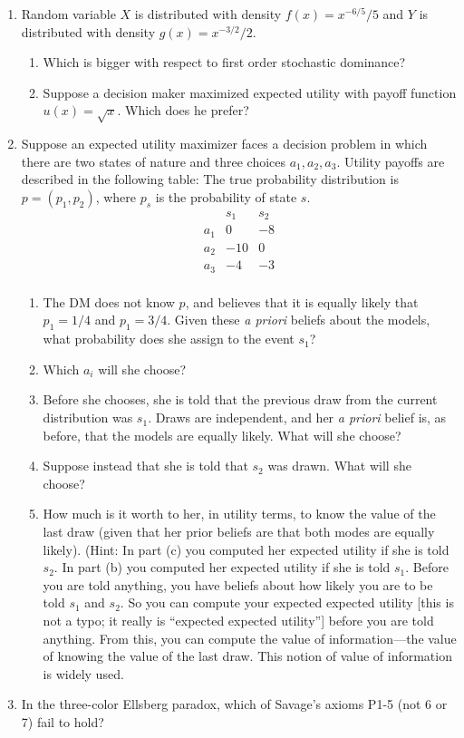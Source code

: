\documentclass[12pt]{article}
\begin{document}
\begin{enumerate}
\begin{enumerate}
	\end{enumerate}
	\item Random variable $X$ is distributed with density $f(x) = x^{-6/5}/5$ and $Y$ is distributed with density $g(x) = x^{-3/2}/2$.
	\begin{enumerate}
		\item Which is bigger with respect to first order stochastic dominance?
		\item Suppose a decision maker maximized expected utility with payoff function $u(x) = \sqrt{x}$. Which does he prefer?
	\end{enumerate}
	\item Suppose an expected utility maximizer faces a decision problem in which there are two states of nature and three choices $a_1,a_2,a_3$. Utility payoffs are described in the following table: The true probability distribution is $p = (p_1,p_2)$, where $p_s$ is the probability of state $s$.
	\[
	\begin{array}{c|cc}
    & s_1 & s_2 \\
    \hline
    a_1 & 0 & -8 \\
    a_2 & -10 & 0 \\
    a_3 & -4 & -3 \\
	\end{array}
	\]
	\begin{enumerate}
		\item The DM does not know $p$, and believes that it is equally likely that $p_1 = 1/4$ and $p_1 = 3/4$. Given these \emph{a priori} beliefs about the models, what probability does she assign to the event $s_1$?
		\item Which $a_i$ will she choose?
		\item Before she chooses, she is told that the previous draw from the current distribution was $s_1$. Draws are independent, and her \emph{a priori} belief is, as before, that the models are equally likely. What will she choose?
		\item Suppose instead that she is told that $s_2$ was drawn. What will she choose?
		\item How much is it worth to her, in utility terms, to know the value of the last draw (given that her prior beliefs are that both modes are equally likely). (Hint: In part (c) you computed her expected utility if she is told $s_2$. In part (b) you computed her expected utility if she is told $s_1$. Before you are told anything, you have beliefs about how likely you are to be told $s_1$ and $s_2$. So you can compute your expected expected utility [this is not a typo; it really is ``expected expected utility''] before you are told anything. From this, you can compute the value of information—the value of knowing the value of the last draw. This notion of value of information is widely used.
	\end{enumerate}
	\item In the three-color Ellsberg paradox, which of Savage's axioms P1-5 (not 6 or 7) fail to hold?
\end{enumerate}
\end{document}
